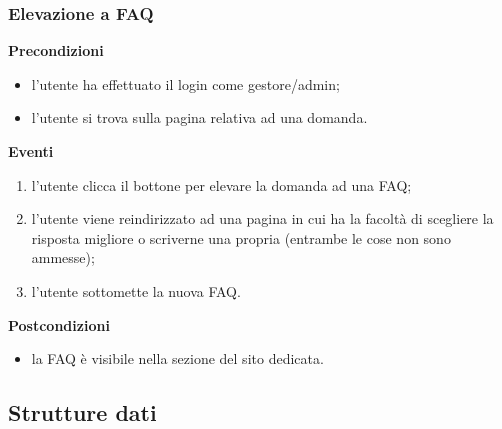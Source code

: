 \documentclass[a4paper, 14pt]{article}
\begin{document}
\begin{flushleft}
			\bigskip
			\subsubsection{Elevazione a FAQ}
			\textbf{Precondizioni}
			\begin{itemize}
				\item l'utente ha effettuato il login come gestore/admin;
				\item l'utente si trova sulla pagina relativa ad una domanda.
			\end{itemize}
			\textbf{Eventi}
			\begin{enumerate}
				\item l'utente clicca il bottone per elevare la domanda ad una FAQ;
				\item l'utente viene reindirizzato ad una pagina in cui ha la facoltà di scegliere la risposta
					  migliore o scriverne una propria (entrambe le cose non sono ammesse);
				\item l'utente sottomette la nuova FAQ.
			\end{enumerate}
			\textbf{Postcondizioni}
			\begin{itemize}
				\item la FAQ è visibile nella sezione del sito dedicata.
			\end{itemize}

		
		\subsection{Strutture dati}

\end{flushleft}
\end{document}
